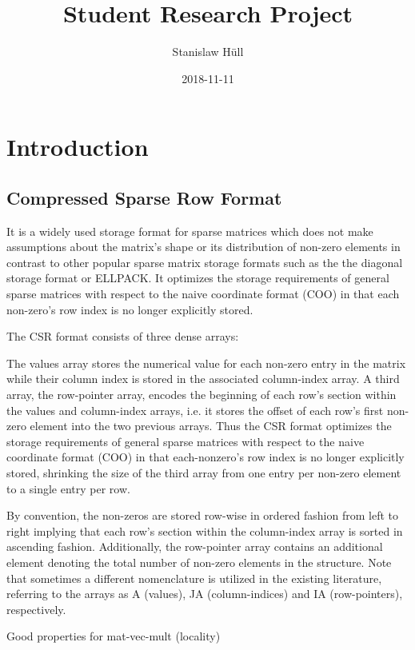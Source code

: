 \documentclass{article}
\author{Stanislaw Hüll}
\title{Student Research Project}
\date{2018-11-11}
\begin{document}
\maketitle

\section{Introduction}

  \subsection{Compressed Sparse Row Format}
    It is a widely used storage format for sparse matrices which does not make assumptions about the matrix's shape
    or its distribution of non-zero elements in contrast to other popular sparse matrix storage formats such as the
    the diagonal storage format or ELLPACK. It optimizes the storage requirements of general sparse matrices with
    respect to the naive coordinate format (COO) in that each non-zero's row index is no longer explicitly stored.

    The CSR format consists of three dense arrays:

    The values array stores the numerical value for each non-zero entry in the matrix while their column index is stored
    in the associated column-index array. A third array, the row-pointer array, encodes the beginning of each row's section within the
    values and column-index arrays, i.e. it stores the offset of each row's first non-zero element into the two previous
    arrays. Thus the CSR format optimizes the storage requirements of general sparse matrices with respect to the naive
    coordinate format (COO) in that each-nonzero's row index is no longer explicitly stored, shrinking the size of the
    third array from one entry per non-zero element to a single entry per row.

    

    By convention, the non-zeros are stored row-wise in ordered fashion from left to right implying that each row's
    section within the column-index array is sorted in ascending fashion. Additionally, the row-pointer array contains
    an additional element denoting the total number of non-zero elements in the structure. Note that sometimes a
    different nomenclature is utilized in the existing literature, referring to the arrays as A (values), JA
    (column-indices) and IA (row-pointers), respectively.

    Good properties for mat-vec-mult (locality)
\end{document}
